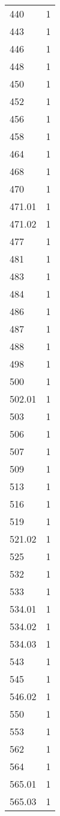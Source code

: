 \begin{table}[ht]
\begin{tabular}{lr}
  440 &   1 \\ 
  443 &   1 \\ 
  446 &   1 \\ 
  448 &   1 \\ 
  450 &   1 \\ 
  452 &   1 \\ 
  456 &   1 \\ 
  458 &   1 \\ 
  464 &   1 \\ 
  468 &   1 \\ 
  470 &   1 \\ 
  471.01 &   1 \\ 
  471.02 &   1 \\ 
  477 &   1 \\ 
  481 &   1 \\ 
  483 &   1 \\ 
  484 &   1 \\ 
  486 &   1 \\ 
  487 &   1 \\ 
  488 &   1 \\ 
  498 &   1 \\ 
  500 &   1 \\ 
  502.01 &   1 \\ 
  503 &   1 \\ 
  506 &   1 \\ 
  507 &   1 \\ 
  509 &   1 \\ 
  513 &   1 \\ 
  516 &   1 \\ 
  519 &   1 \\ 
  521.02 &   1 \\ 
  525 &   1 \\ 
  532 &   1 \\ 
  533 &   1 \\ 
  534.01 &   1 \\ 
  534.02 &   1 \\ 
  534.03 &   1 \\ 
  543 &   1 \\ 
  545 &   1 \\ 
  546.02 &   1 \\ 
  550 &   1 \\ 
  553 &   1 \\ 
  562 &   1 \\ 
  564 &   1 \\ 
  565.01 &   1 \\ 
  565.03 &   1 \\ 

\end{tabular}
\end{table}
